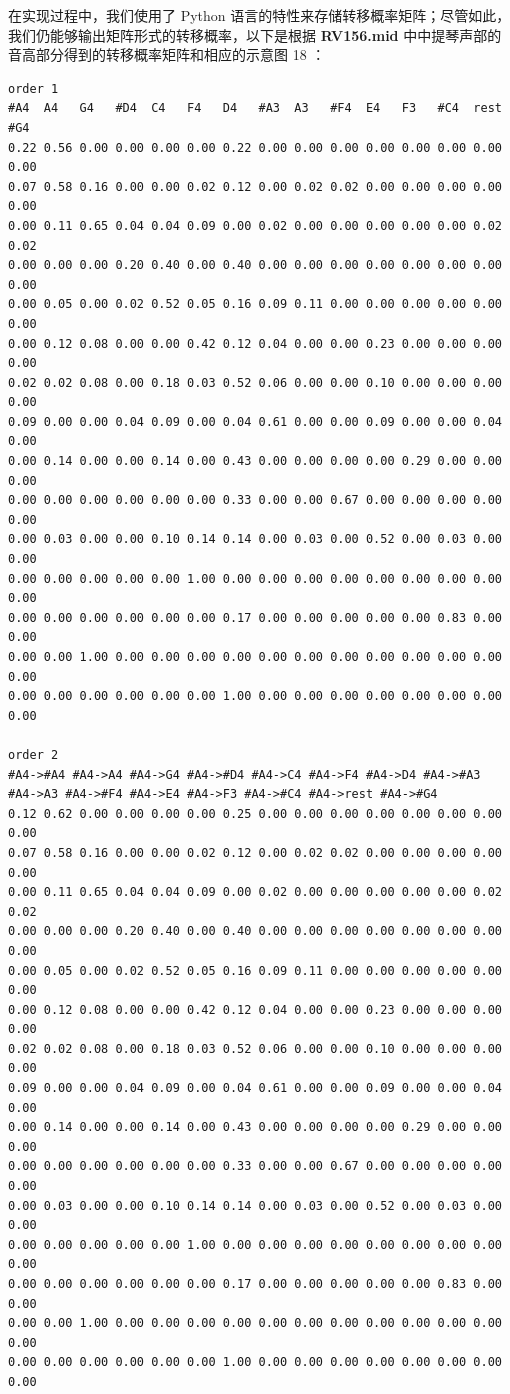 \documentclass[11pt]{article}
\begin{document}
在实现过程中，我们使用了 Python 语言的特性来存储转移概率矩阵；尽管如此，我们仍能够输出矩阵形式的转移概率，以下是根据 \textbf{RV156.mid} 中中提琴声部的音高部分得到的转移概率矩阵和相应的示意图 18 ：
\begin{verbatim}
order 1
#A4  A4   G4   #D4  C4   F4   D4   #A3  A3   #F4  E4   F3   #C4  rest #G4 
0.22 0.56 0.00 0.00 0.00 0.00 0.22 0.00 0.00 0.00 0.00 0.00 0.00 0.00 0.00 
0.07 0.58 0.16 0.00 0.00 0.02 0.12 0.00 0.02 0.02 0.00 0.00 0.00 0.00 0.00 
0.00 0.11 0.65 0.04 0.04 0.09 0.00 0.02 0.00 0.00 0.00 0.00 0.00 0.02 0.02 
0.00 0.00 0.00 0.20 0.40 0.00 0.40 0.00 0.00 0.00 0.00 0.00 0.00 0.00 0.00 
0.00 0.05 0.00 0.02 0.52 0.05 0.16 0.09 0.11 0.00 0.00 0.00 0.00 0.00 0.00 
0.00 0.12 0.08 0.00 0.00 0.42 0.12 0.04 0.00 0.00 0.23 0.00 0.00 0.00 0.00 
0.02 0.02 0.08 0.00 0.18 0.03 0.52 0.06 0.00 0.00 0.10 0.00 0.00 0.00 0.00 
0.09 0.00 0.00 0.04 0.09 0.00 0.04 0.61 0.00 0.00 0.09 0.00 0.00 0.04 0.00 
0.00 0.14 0.00 0.00 0.14 0.00 0.43 0.00 0.00 0.00 0.00 0.29 0.00 0.00 0.00 
0.00 0.00 0.00 0.00 0.00 0.00 0.33 0.00 0.00 0.67 0.00 0.00 0.00 0.00 0.00 
0.00 0.03 0.00 0.00 0.10 0.14 0.14 0.00 0.03 0.00 0.52 0.00 0.03 0.00 0.00 
0.00 0.00 0.00 0.00 0.00 1.00 0.00 0.00 0.00 0.00 0.00 0.00 0.00 0.00 0.00 
0.00 0.00 0.00 0.00 0.00 0.00 0.17 0.00 0.00 0.00 0.00 0.00 0.83 0.00 0.00 
0.00 0.00 1.00 0.00 0.00 0.00 0.00 0.00 0.00 0.00 0.00 0.00 0.00 0.00 0.00 
0.00 0.00 0.00 0.00 0.00 0.00 1.00 0.00 0.00 0.00 0.00 0.00 0.00 0.00 0.00 

order 2
#A4->#A4 #A4->A4 #A4->G4 #A4->#D4 #A4->C4 #A4->F4 #A4->D4 #A4->#A3 #A4->A3 #A4->#F4 #A4->E4 #A4->F3 #A4->#C4 #A4->rest #A4->#G4
0.12 0.62 0.00 0.00 0.00 0.00 0.25 0.00 0.00 0.00 0.00 0.00 0.00 0.00 0.00 
0.07 0.58 0.16 0.00 0.00 0.02 0.12 0.00 0.02 0.02 0.00 0.00 0.00 0.00 0.00 
0.00 0.11 0.65 0.04 0.04 0.09 0.00 0.02 0.00 0.00 0.00 0.00 0.00 0.02 0.02 
0.00 0.00 0.00 0.20 0.40 0.00 0.40 0.00 0.00 0.00 0.00 0.00 0.00 0.00 0.00 
0.00 0.05 0.00 0.02 0.52 0.05 0.16 0.09 0.11 0.00 0.00 0.00 0.00 0.00 0.00 
0.00 0.12 0.08 0.00 0.00 0.42 0.12 0.04 0.00 0.00 0.23 0.00 0.00 0.00 0.00 
0.02 0.02 0.08 0.00 0.18 0.03 0.52 0.06 0.00 0.00 0.10 0.00 0.00 0.00 0.00 
0.09 0.00 0.00 0.04 0.09 0.00 0.04 0.61 0.00 0.00 0.09 0.00 0.00 0.04 0.00 
0.00 0.14 0.00 0.00 0.14 0.00 0.43 0.00 0.00 0.00 0.00 0.29 0.00 0.00 0.00 
0.00 0.00 0.00 0.00 0.00 0.00 0.33 0.00 0.00 0.67 0.00 0.00 0.00 0.00 0.00 
0.00 0.03 0.00 0.00 0.10 0.14 0.14 0.00 0.03 0.00 0.52 0.00 0.03 0.00 0.00 
0.00 0.00 0.00 0.00 0.00 1.00 0.00 0.00 0.00 0.00 0.00 0.00 0.00 0.00 0.00 
0.00 0.00 0.00 0.00 0.00 0.00 0.17 0.00 0.00 0.00 0.00 0.00 0.83 0.00 0.00 
0.00 0.00 1.00 0.00 0.00 0.00 0.00 0.00 0.00 0.00 0.00 0.00 0.00 0.00 0.00 
0.00 0.00 0.00 0.00 0.00 0.00 1.00 0.00 0.00 0.00 0.00 0.00 0.00 0.00 0.00 
\end{verbatim}
\end{document}
